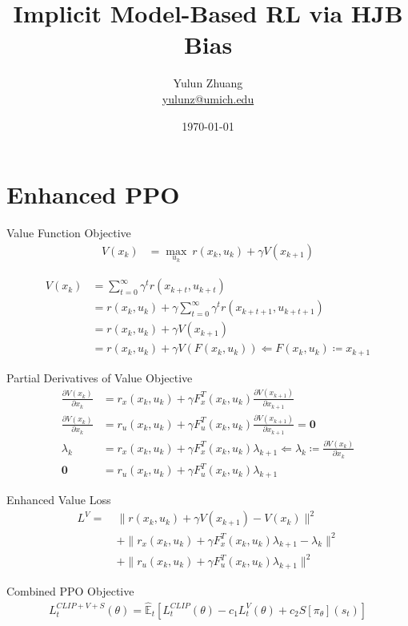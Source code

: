 \documentclass{article}
\title{Implicit Model-Based RL via HJB Bias}
\author{Yulun Zhuang \\ \href{mailto:yulunz@umich.edu}{yulunz@umich.edu}}
\date{\today}
\theoremstyle{definition} %
\begin{document}
\maketitle
\section*{Enhanced PPO}

Value Function Objective
\begin{align*}
    V(x_k) &= \max_{u_k}\ r(x_k, u_k) + \gamma V(x_{k+1})
\end{align*}

\begin{align*}
    V(x_k) &= \sum_{t=0}^\infty \gamma^t r(x_{k+t}, u_{k+t})\\
    &= r(x_k, u_k) + \gamma \sum_{t=0}^\infty \gamma^t r(x_{k+t+1}, u_{k+t+1})\\
    &= r(x_k, u_k) + \gamma V(x_{k+1})\\
    &= r(x_k, u_k) + \gamma V(F(x_k, u_k)) \Leftarrow F(x_k, u_k) \coloneqq x_{k+1}
\end{align*}

Partial Derivatives of Value Objective
\begin{align*}
    \frac{\partial V(x_k)}{\partial x_k} 
    &= r_x(x_k, u_k) + \gamma F_x^T(x_k, u_k)\frac{\partial V(x_{k+1})}{\partial x_{k+1}}\\
    \frac{\partial V(x_k)}{\partial x_k} 
    &= r_u(x_k, u_k) + \gamma F_u^T(x_k, u_k)\frac{\partial V(x_{k+1})}{\partial x_{k+1}} = \mathbf{0}\\
    \lambda_k
    &= r_x(x_k, u_k) + \gamma F_x^T(x_k, u_k) \lambda_{k+1} \Leftarrow \lambda_k \coloneqq \frac{\partial V(x_k)}{\partial x_k}\\
    \mathbf{0} 
    &= r_u(x_k, u_k) + \gamma F_u^T(x_k, u_k)\lambda_{k+1}
\end{align*}

Enhanced Value Loss
\begin{align*}
    L^V = \ 
    &\|r(x_k, u_k) + \gamma V(x_{k+1}) - V(x_k) \|^2\\
    & + \|r_x(x_k, u_k) + \gamma F_x^T(x_k, u_k)\lambda_{k+1}- \lambda_k\|^2\\
    & + \|r_u(x_k, u_k) + \gamma F_u^T(x_k, u_k)\lambda_{k+1}\|^2
\end{align*}

Combined PPO Objective
\begin{align*}
    L_t^{C L I P+V+S}(\theta)=\hat{\mathbb{E}}_t\left[L_t^{C L I P}(\theta)-c_1 L_t^{V}(\theta)+c_2 S\left[\pi_\theta\right]\left(s_t\right)\right]
\end{align*}
\end{document}

